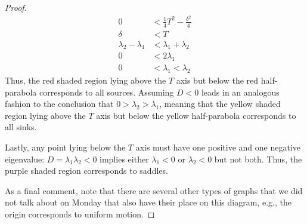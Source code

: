 \documentclass[../psets.tex]{subfiles}
\begin{document}
\begin{enumerate}
\begin{enumerate}
\begin{proof}
\begin{align*}
                0 &< \frac{1}{4}T^2-\frac{\delta^2}{4}\\
                \delta &< T\\
                \lambda_2-\lambda_1 &< \lambda_1+\lambda_2\\
                0 &< 2\lambda_1\\
                0 &< \lambda_1 < \lambda_2
            \end{align*}
            Thus, the red shaded region lying above the $T$ axis but below the red half-parabola corresponds to all sources. Assuming $D<0$ leads in an analogous fashion to the conclusion that $0>\lambda_2>\lambda_1$, meaning that the yellow shaded region lying above the $T$ axis but below the yellow half-parabola corresponds to all sinks.\par
            Lastly, any point lying below the $T$ axis must have one positive and one negative eigenvalue: $D=\lambda_1\lambda_2<0$ implies either $\lambda_1<0$ or $\lambda_2<0$ but not both. Thus, the purple shaded region corresponds to saddles.\par
            As a final comment, note that there are several other types of graphs that we did not talk about on Monday that also have their place on this diagram, e.g., the origin corresponds to uniform motion.
        \end{proof}
    \end{enumerate}
\end{enumerate}


\end{document}
